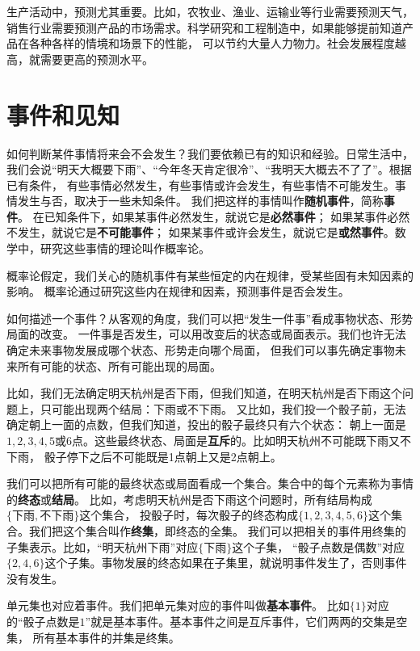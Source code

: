 \documentclass[12pt,UTF8]{ctexbook}
\begin{document}
生产活动中，预测尤其重要。比如，农牧业、渔业、运输业等行业需要预测天气，
销售行业需要预测产品的市场需求。科学研究和工程制造中，如果能够提前知道产品在各种各样的情境和场景下的性能，
可以节约大量人力物力。社会发展程度越高，就需要更高的预测水平。

\section{事件和见知}

如何判断某件事情将来会不会发生？我们要依赖已有的知识和经验。日常生活中，
我们会说“明天大概要下雨”、“今年冬天肯定很冷”、“我明天大概去不了了”。根据已有条件，
有些事情必然发生，有些事情或许会发生，有些事情不可能发生。事情发生与否，取决于一些未知条件。
我们把这样的事情叫作\textbf{随机事件}，简称\textbf{事件}。
在已知条件下，如果某事件必然发生，就说它是\textbf{必然事件}；
如果某事件必然不发生，就说它是\textbf{不可能事件}；
如果某事件或许会发生，就说它是\textbf{或然事件}。数学中，研究这些事情的理论叫作概率论。

概率论假定，我们关心的随机事件有某些恒定的内在规律，受某些固有未知因素的影响。
概率论通过研究这些内在规律和因素，预测事件是否会发生。

如何描述一个事件？从客观的角度，我们可以把“发生一件事”看成事物状态、形势局面的改变。
一件事是否发生，可以用改变后的状态或局面表示。我们也许无法确定未来事物发展成哪个状态、形势走向哪个局面，
但我们可以事先确定事物未来所有可能的状态、所有可能出现的局面。

比如，我们无法确定明天杭州是否下雨，但我们知道，在明天杭州是否下雨这个问题上，只可能出现两个结局：下雨或不下雨。
又比如，我们投一个骰子前，无法确定朝上一面的点数，但我们知道，投出的骰子最终只有六个状态：
朝上一面是$1,2,3,4,5$或$6$点。这些最终状态、局面是\textbf{互斥}的。比如明天杭州不可能既下雨又不下雨，
骰子停下之后不可能既是1点朝上又是2点朝上。

我们可以把所有可能的最终状态或局面看成一个集合。集合中的每个元素称为事情的\textbf{终态}或\textbf{结局}。
比如，考虑明天杭州是否下雨这个问题时，所有结局构成$\{\mbox{下雨}, \mbox{不下雨}\}$这个集合，
投骰子时，每次骰子的终态构成$\{1,2,3,4,5,6\}$这个集合。我们把这个集合叫作\textbf{终集}，即终态的全集。
我们可以把相关的事件用终集的子集表示。比如，“明天杭州下雨”对应$\{\mbox{下雨}\}$这个子集，
“骰子点数是偶数”对应$\{2,4,6\}$这个子集。事物发展的终态如果在子集里，就说明事件发生了，否则事件没有发生。

单元集也对应着事件。我们把单元集对应的事件叫做\textbf{基本事件}。
比如$\{1\}$对应的“骰子点数是$1$”就是基本事件。基本事件之间是互斥事件，它们两两的交集是空集，
所有基本事件的并集是终集。
\end{document}
